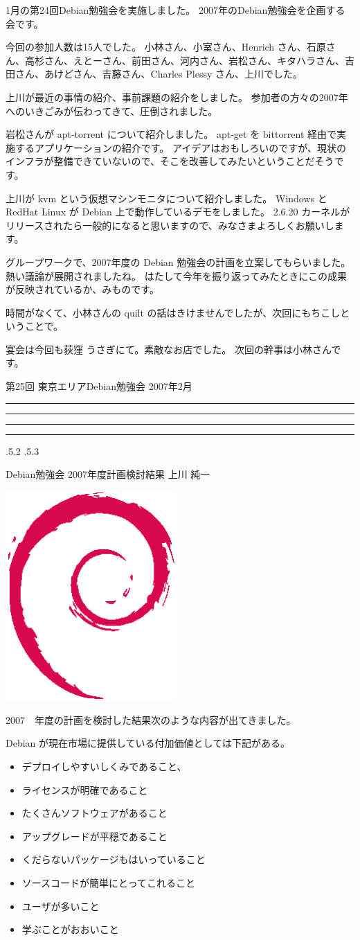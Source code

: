 \documentclass[mingoth,a4paper]{jsarticle}
\makeatletter
\newcommand{\debmtgyear}{2007}
\newcommand{\debmtgmonth}{2}
\newcommand{\debmtgnumber}{25}
\renewcommand{\section}{\@startsection{section}{1}{\z@}%
    {\Cvs \@plus.5\Cdp \@minus.2\Cdp}%
    {.5\Cvs \@plus.3\Cdp}%
    {\normalfont\gt\fontsize{32}{32}\headfont\raggedright}} %
\newcommand{\dancersection}[2]{%
\newpage
第\debmtgnumber{}回 東京エリアDebian勉強会 \debmtgyear{}年\debmtgmonth{}月
\hrule
\vspace{0.5mm}
\hrule
%
\vspace{4cm}
\hrule
\vspace{0.5mm}
\hrule
%
\vspace{-7cm}
\begin{minipage}[b]{0.7\hsize}
\section{#1}
\hfill{}#2\\
\vspace{2cm}
\end{minipage}
\begin{minipage}[b]{0.3\hsize}
\hfill{}\includegraphics[height=8cm]{image200502/openlogo-nd.eps}\\
\end{minipage}
%
\vspace{-1cm}
}
\makeatother
\begin{document}
	  1月の第24回Debian勉強会を実施しました。
	   2007年のDebian勉強会を企画する会です。
	  
	  今回の参加人数は15人でした。
	  小林さん、小室さん、Henrich さん、石原さん、高杉さん、えとーさん、前田さん、河内さん、岩松さん、キタハラさん、吉田さん、あけどさん、吉藤さん、Charles Plessy さん、上川でした。
        
	
	  
	    上川が最近の事情の紹介、事前課題の紹介をしました。
	    参加者の方々の2007年へのいきごみが伝わってきて、圧倒されました。
	  
	  岩松さんが apt-torrent について紹介しました。
	    apt-get を bittorrent 経由で実施するアプリケーションの紹介です。
	    アイデアはおもしろいのですが、現状のインフラが整備できていないので、そこを改善してみたいということだそうです。
	  
	  
	    上川が kvm という仮想マシンモニタについて紹介しました。
	    Windows と RedHat Linux が Debian 上で動作しているデモをしました。
	    2.6.20 カーネルがリリースされたら一般的になると思いますので、みなさまよろしくお願いします。
	  
	  
	    グループワークで、2007年度の Debian 勉強会の計画を立案してもらいました。
	    熱い議論が展開されましたね。
	    はたして今年を振り返ってみたときにこの成果が反映されているか、みものです。
	  
	  
	    時間がなくて、小林さんの quilt の話はきけませんでしたが、次回にもちこしということで。
	  
	  
	    宴会は今回も荻窪 うさぎにて。素敵なお店でした。
	    次回の幹事は小林さんです。
	  


\dancersection{Debian勉強会 2007年度計画検討結果}{上川 純一}
\label{sec:debmtg2007plandone}

2007　年度の計画を検討した結果次のような内容が出てきました。

Debian が現在市場に提供している付加価値としては下記がある。
\begin{itemize}
 \item 	 デプロイしやすいしくみであること、
 \item	 ライセンスが明確であること
 \item	 たくさんソフトウェアがあること
 \item	 アップグレードが平穏であること
 \item	 くだらないパッケージもはいっていること
 \item	 ソースコードが簡単にとってこれること
 \item	 ユーザが多いこと
 \item	 学ぶことがおおいこと
\end{itemize}
\end{document}
